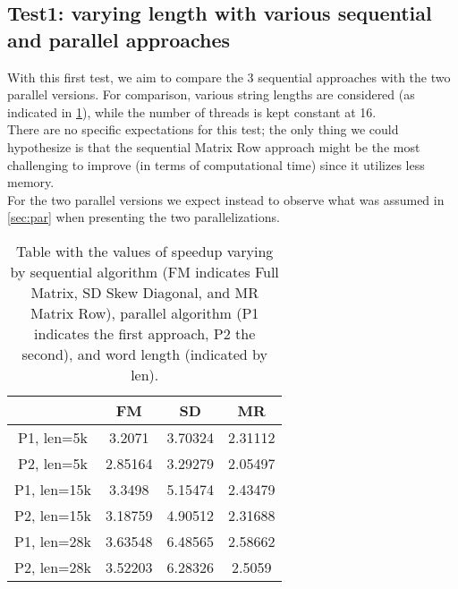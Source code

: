 \documentclass[10pt,twocolumn,letterpaper]{article}
\begin{document}
\subsection{Test1: varying length with various sequential and parallel approaches}
\label{sec:t1}
With this first test, we aim to compare the 3 sequential approaches with the two parallel versions. For comparison, various string lengths are considered (as indicated in \cref{table:t1}), while the number of threads is kept constant at 16.\\ There are no specific expectations for this test; the only thing we could hypothesize is that the sequential Matrix Row approach might be the most challenging to improve (in terms of computational time) since it utilizes less memory.\\
For the two parallel versions we expect instead to observe what was assumed in \cref{sec:par} when presenting the two parallelizations.

\begin{table}[h]
\centering
\begin{tabular}{ |c|c|c|c| } 
\hline
 & FM & SD & MR\\
\hline
P1, len=5k & 3.2071 & 3.70324 & 2.31112\\
\hline
P2, len=5k & 2.85164 & 3.29279 & 2.05497\\
\hline
P1, len=15k & 3.3498 & 5.15474 & 2.43479\\
\hline
P2, len=15k & 3.18759 & 4.90512 & 2.31688\\
\hline
P1, len=28k & 3.63548 & 6.48565 & 2.58662\\
\hline
P2, len=28k & 3.52203 & 6.28326 & 2.5059\\
\hline
\end{tabular}
\vspace*{3mm}
\caption{Table with the values of speedup varying by sequential algorithm (FM indicates Full Matrix, SD Skew Diagonal, and MR Matrix Row), parallel algorithm (P1 indicates the first approach, P2 the second), and word length (indicated by len).}
\label{table:t1}
\end{table}
\end{document}
